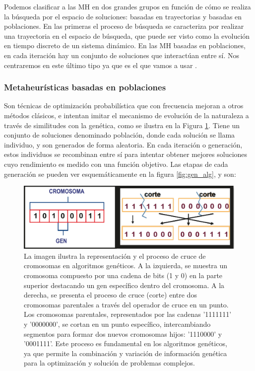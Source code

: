 Podemos clasificar a las MH en dos grandes grupos en función de cómo se realiza la búsqueda por el espacio de soluciones: basadas en trayectorias y basadas en poblaciones. En las primeras el proceso de búsqueda se caracteriza por realizar una trayectoria en el espacio de búsqueda, que puede ser visto como la evolución en tiempo discreto de un sistema dinámico. En las MH basadas en poblaciones, en cada iteración hay un conjunto de soluciones que interactúan entre sí. Nos centraremos en este último tipo ya que es el que vamos a usar \cite{mhhandbook}.

\subsubsection{Metaheurísticas basadas en poblaciones}

Son técnicas de optimización probabilística que con frecuencia mejoran a otros métodos clásicos, e intentan imitar el mecanismo de evolución de la naturaleza a través de similitudes con la genética, como se ilustra en la Figura \ref{fig:cruce_mh}. Tiene un conjunto de soluciones denominado población, donde cada solución se llama individuo, y son generados de forma aleatoria. En cada iteración o generación, estos individuos se recombinan entre sí para intentar obtener mejores soluciones cuyo rendimiento es medido con una función objetivo. Las etapas de cada generación se pueden ver esquemáticamente en la figura \ref{fig:gen_alg}, y son:

\begin{figure}
    \centering
    \includegraphics[width=0.75\linewidth]{Plantilla_TFG_latex//imagenes//Inf//2.Fund/cruce_mh.png}
    \caption[Representación y cruce de cromosomas en algoritmos genéticos]{La imagen ilustra la representación y el proceso de cruce de cromosomas en algoritmos genéticos. A la izquierda, se muestra un cromosoma compuesto por una cadena de bits (1 y 0) en la parte superior destacando un gen específico dentro del cromosoma. A la derecha, se presenta el proceso de cruce (corte) entre dos cromosomas parentales a través del operador de cruce en un punto. Los cromosomas parentales, representados por las cadenas '1111111' y '0000000', se cortan en un punto específico, intercambiando segmentos para formar dos nuevos cromosomas hijos: '1110000' y '0001111'. Este proceso es fundamental en los algoritmos genéticos, ya que permite la combinación y variación de información genética para la optimización y solución de problemas complejos.}%
    \label{fig:cruce_mh}
\end{figure}


